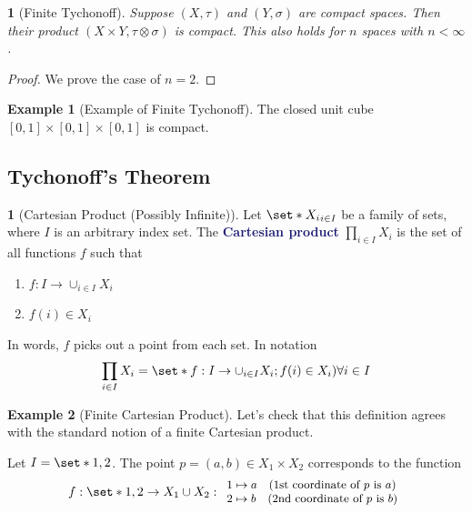 \documentclass[11pt]{article}
\numberwithin{equation}{section}
\newcommand{\navy}[1]{\textcolor{MidnightBlue}{\bf #1}}
\theoremstyle{plain}
\newtheorem{theorem}{\color{ForestGreen}{\textbf{Theorem}}}[section]
\theoremstyle{definition}
\newtheorem{definition}{\color{MidnightBlue}{\textbf{Definition}}}[section]
\newtheorem{example}{\color{WildStrawberry}Example}[section]
\def\Set{\set*}%
\newcommand{\1}{\mathbbm 1}
\def\t{\tau}
\begin{document}
\begin{theorem}[Finite Tychonoff]
	Suppose $(X,\t)$ and $(Y,\sigma)$ are compact spaces. Then their product $(X\times Y, \t \otimes \sigma)$ is compact. This also holds for $n$ spaces with $n < \infty$. 
\end{theorem}
\begin{proof}
	We prove the case of $n=2$.
\end{proof}

\begin{example}[Example of Finite Tychonoff]
	The closed unit cube $[0,1]\times[0,1] \times [0,1]$ is compact. 
\end{example}

\subsection{Tychonoff's Theorem}

\begin{definition}[Cartesian Product (Possibly Infinite)]
	Let $\Set{X_i}_{i\in I}$ be a family of sets, where $I$ is an arbitrary index set. The \navy{Cartesian product} $\prod_{i \in I} X_i$ is the set of all functions $f$ such that
	\begin{enumerate}
		\item $f: I \to \cup_{i \in I} X_i$ 
		\item $f(i) \in X_i$
	\end{enumerate}
	In words, $f$ picks out a point from each set. In notation
	\begin{equation}
		\prod_{i \in I} X_i = \Set{f: I \to \cup_{i \in I} X_i; f(i) \in X_i) \forall i \in I}
	\end{equation}
\end{definition}


\begin{example}[Finite Cartesian Product]
	Let's check that this definition agrees with the standard notion of a finite Cartesian product. 

	Let $I = \Set{1,2}$. The point $p = (a,b) \in X_1 \times X_2$ corresponds to the function
	\begin{equation}
		f: \Set{1,2} \to X_1 \cup X_2 : 
		\small
		\begin{array}{l}
		1 \mapsto a \quad \text{(1st coordinate of $p$ is $a$)}\\
		2 \mapsto b \quad \text{(2nd coordinate of $p$ is $b$)}\\
		\end{array}
		\normalsize
	\end{equation}
\end{example}
\end{document}
